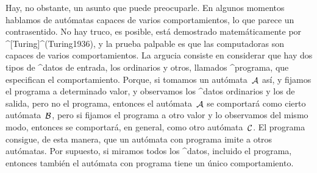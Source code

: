 Hay, no obstante, un asunto que puede preocuparle. En algunos momentos
hablamos de autómatas capaces de varios comportamientos, lo que parece
un contrasentido. No hay truco, es posible, está demostrado
matemáticamente por ^[Turing]^(Turing1936), y la prueba palpable es que
las computadoras son capaces de varios comportamientos. La argucia
consiste en considerar que hay dos tipos de ^{datos de entrada}, los
ordinarios y otros, llamados ^{programa}, que especifican el
comportamiento. Porque, si tomamos un autómata~$\aut A$ así, y fijamos
el programa a determinado valor, y observamos los ^{datos ordinarios} y
los de salida, pero no el programa, entonces el autómata~$\aut A$ se
comportará como cierto autómata~$\aut B$, pero si fijamos el programa a
otro valor y lo observamos del mismo modo, entonces se comportará, en
general, como otro autómata~$\aut C$. El programa consigue, de esta
manera, que un autómata con programa imite a otros autómatas. Por
supuesto, si miramos todos los ^{datos}, incluido el programa, entonces
también el autómata con programa tiene un único comportamiento.


\endinput
